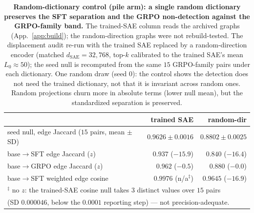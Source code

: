 \documentclass{article}
\begin{document}
\begin{table}[h]
\centering
\caption{\textbf{Random-dictionary control (pile arm): a single random dictionary preserves the SFT separation and the GRPO non-detection against the GRPO-family band.} The trained-SAE column reads the archived graphs (App.~\ref{app:build}); the random-direction graphs were not rebuild-tested. The displacement audit re-run with the trained SAE replaced by a random-direction encoder (matched $d_{\text{SAE}}=32{,}768$, top-$k$ calibrated to the trained SAE's mean $L_0\approx50$); the seed null is recomputed from the same $15$ GRPO-family pairs under each dictionary. One random draw (seed $0$): the control shows the detection does not need the trained dictionary, not that it is invariant across random ones. Random projections churn more in absolute terms (lower null mean), but the standardized separation is preserved.}
\label{tab:randsae}
\small
\begin{tabular}{lrr}
\toprule
 & trained SAE & random-dir \\
\midrule
seed null, edge Jaccard ($15$ pairs, mean $\pm$ SD) & $0.9626\pm0.0016$ & $0.8802\pm0.0025$ \\
base$\to$SFT edge Jaccard ($z$) & $0.937$ ($-15.9$) & $0.840$ ($\mathbf{-16.4}$) \\
base$\to$GRPO edge Jaccard ($z$) & $0.962$ ($-0.5$) & $0.880$ ($-0.0$) \\
base$\to$SFT weighted edge cosine & $0.9976$ (n/a$^{\ddagger}$) & $0.9645$ ($\mathbf{-16.9}$) \\
\bottomrule
\multicolumn{3}{l}{\footnotesize $^{\ddagger}$ no $z$: the trained-SAE cosine null takes $3$ distinct values over $15$ pairs} \\
\multicolumn{3}{l}{\footnotesize (SD $0.000046$, below the $0.0001$ reporting step) --- not precision-adequate.} \\
\end{tabular}
\end{table}
\end{document}
